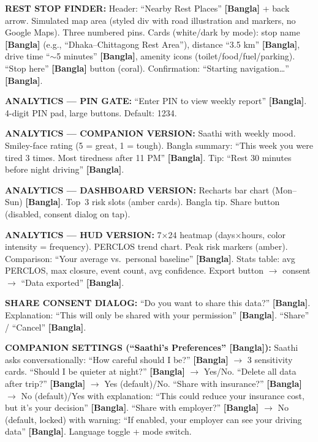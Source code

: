 \documentclass[sigconf]{acmart}
\begin{document}
 
\begin{promptbox}
\textbf{REST STOP FINDER:} Header: ``Nearby Rest Places'' \textbf{[Bangla]} + back arrow. Simulated map area (styled div with road illustration and markers, no Google Maps). Three numbered pins. Cards (white/dark by mode): stop name \textbf{[Bangla]} (e.g., ``Dhaka--Chittagong Rest Area''), distance ``3.5 km'' \textbf{[Bangla]}, drive time ``$\sim$5 minutes'' \textbf{[Bangla]}, amenity icons (toilet/food/fuel/parking). ``Stop here'' \textbf{[Bangla]} button (coral). Confirmation: ``Starting navigation\ldots'' \textbf{[Bangla]}.
 
\textbf{ANALYTICS --- PIN GATE:} ``Enter PIN to view weekly report'' \textbf{[Bangla]}. 4-digit PIN pad, large buttons. Default: 1234.
 
\textbf{ANALYTICS --- COMPANION VERSION:} Saathi with weekly mood. Smiley-face rating (5 = great, 1 = tough). Bangla summary: ``This week you were tired 3 times. Most tiredness after 11 PM'' \textbf{[Bangla]}. Tip: ``Rest 30 minutes before night driving'' \textbf{[Bangla]}.
 
\textbf{ANALYTICS --- DASHBOARD VERSION:} Recharts bar chart (Mon--Sun) \textbf{[Bangla]}. Top~3 risk slots (amber cards). Bangla tip. Share button (disabled, consent dialog on tap).
 
\textbf{ANALYTICS --- HUD VERSION:} 7$\times$24 heatmap (days$\times$hours, color intensity = frequency). PERCLOS trend chart. Peak risk markers (amber). Comparison: ``Your average vs.\ personal baseline'' \textbf{[Bangla]}. Stats table: avg PERCLOS, max closure, event count, avg confidence. Export button $\rightarrow$ consent $\rightarrow$ ``Data exported'' \textbf{[Bangla]}.
 
\textbf{SHARE CONSENT DIALOG:} ``Do you want to share this data?'' \textbf{[Bangla]}. Explanation: ``This will only be shared with your permission'' \textbf{[Bangla]}. ``Share'' / ``Cancel'' \textbf{[Bangla]}.
 
\textbf{COMPANION SETTINGS (``Saathi's Preferences'' [Bangla]):} Saathi asks conversationally: ``How careful should I be?'' \textbf{[Bangla]} $\rightarrow$ 3 sensitivity cards. ``Should I be quieter at night?'' \textbf{[Bangla]} $\rightarrow$ Yes/No. ``Delete all data after trip?'' \textbf{[Bangla]} $\rightarrow$ Yes (default)/No. ``Share with insurance?'' \textbf{[Bangla]} $\rightarrow$ No (default)/Yes with explanation: ``This could reduce your insurance cost, but it's your decision'' \textbf{[Bangla]}. ``Share with employer?'' \textbf{[Bangla]} $\rightarrow$ No (default, locked) with warning: ``If enabled, your employer can see your driving data'' \textbf{[Bangla]}. Language toggle + mode switch.
 

\end{promptbox}
\end{document}
